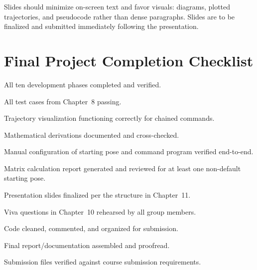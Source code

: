 \documentclass[12pt]{report}
\begin{document}
\begin{infobox}[title=Presentation Reminders]
Slides should minimize on-screen text and favor visuals: diagrams, plotted trajectories, and pseudocode rather than dense paragraphs. Slides are to be finalized and submitted immediately following the presentation.
\end{infobox}

\chapter{Final Project Completion Checklist}

\begin{checklist}
\item All ten development phases completed and verified.
\item All test cases from Chapter~8 passing.
\item Trajectory visualization functioning correctly for chained commands.
\item Mathematical derivations documented and cross-checked.
\item Manual configuration of starting pose and command program verified end-to-end.
\item Matrix calculation report generated and reviewed for at least one non-default starting pose.
\item Presentation slides finalized per the structure in Chapter~11.
\item Viva questions in Chapter~10 rehearsed by all group members.
\item Code cleaned, commented, and organized for submission.
\item Final report/documentation assembled and proofread.
\item Submission files verified against course submission requirements.
\end{checklist}
\end{document}
